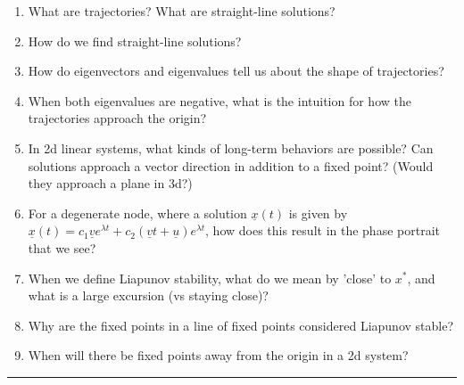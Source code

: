 \documentclass[12pt,letterpaper,noanswers]{exam}
\begin{document}
\begin{enumerate}
\itemsep0em
    \item What are trajectories?  What are straight-line solutions?
    \item How do we find straight-line solutions?
    \item How do eigenvectors and eigenvalues tell us about the shape of trajectories?
    \item When both eigenvalues are negative, what is the intuition for how the trajectories approach the origin?
    \item In 2d linear systems, what kinds of long-term behaviors are possible?  Can solutions approach a vector direction in addition to a fixed point?  (Would they approach a plane in 3d?)
    \item For a degenerate node, where  a solution $\underline{x}(t)$ is given by $\underline x(t) = c_1 \underline{v}e^{\lambda t} + c_2(\underline{v} t + \underline{u})e^{\lambda t}$, how does this result in the phase portrait that we see?
    \item When we define Liapunov stability, what do we mean by 'close' to $x^*$, and what is a large excursion (vs staying close)?
    \item Why are the fixed points in a line of fixed points considered Liapunov stable?
    \item When will there be fixed points away from the origin in a 2d system?
\end{enumerate}

\vspace{0.2cm}

\hrule
\vspace{0.2cm}
\end{document}
